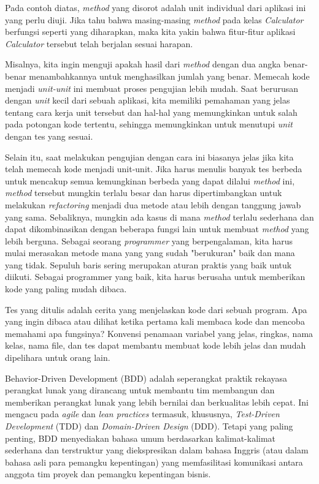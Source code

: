 \documentclass[a4paper,twoside]{article}
\begin{document}
\begin{enumerate}
Pada contoh diatas, \textit{method} yang disorot adalah unit individual dari aplikasi ini yang perlu diuji. Jika tahu bahwa masing-masing \textit{method} pada kelas \textit{Calculator} berfungsi seperti yang diharapkan, maka kita yakin bahwa fitur-fitur aplikasi \textit{Calculator} tersebut telah berjalan sesuai harapan.

Misalnya, kita ingin menguji apakah hasil dari \textit{method} dengan dua angka benar-benar menambahkannya untuk menghasilkan jumlah yang benar. Memecah kode menjadi \textit{unit-unit} ini membuat proses pengujian lebih mudah. Saat berurusan dengan \textit{unit} kecil dari sebuah aplikasi, kita memiliki pemahaman yang jelas tentang cara kerja unit tersebut dan hal-hal yang memungkinkan untuk salah pada potongan kode tertentu, sehingga memungkinkan untuk menutupi \textit{unit} dengan tes yang sesuai.

Selain itu, saat melakukan pengujian dengan cara ini biasanya jelas jika kita telah memecah kode menjadi unit-unit. Jika harus menulis banyak tes berbeda untuk mencakup semua kemungkinan berbeda yang dapat dilalui \textit{method} ini, \textit{method} tersebut mungkin terlalu besar dan harus dipertimbangkan untuk melakukan \textit{refactoring} menjadi dua metode atau lebih dengan tanggung jawab yang sama. Sebaliknya, mungkin ada kasus di mana \textit{method} terlalu sederhana dan dapat dikombinasikan dengan beberapa fungsi lain untuk membuat \textit{method} yang lebih berguna. Sebagai seorang \textit{programmer} yang berpengalaman, kita harus mulai merasakan metode mana yang yang sudah "berukuran" baik dan mana yang tidak. Sepuluh baris sering merupakan aturan praktis yang baik untuk diikuti. Sebagai programmer yang baik, kita harus berusaha untuk memberikan kode yang paling mudah dibaca.

Tes yang ditulis adalah cerita yang menjelaskan kode dari sebuah program. Apa yang ingin dibaca atau dilihat ketika pertama kali membaca kode dan mencoba memahami apa fungsinya? Konvensi penamaan variabel yang jelas, ringkas, nama kelas, nama file, dan tes dapat membantu membuat kode lebih jelas dan mudah dipelihara untuk orang lain.

Behavior-Driven Development (BDD) adalah seperangkat praktik rekayasa perangkat lunak yang dirancang untuk membantu tim membangun dan memberikan perangkat lunak yang lebih bernilai dan berkualitas lebih cepat. Ini mengacu pada \textit{agile} dan \textit{lean practices} termasuk, khususnya, \textit{Test-Driven Development} (TDD) dan \textit{Domain-Driven Design} (DDD). Tetapi yang paling penting, BDD menyediakan bahasa umum berdasarkan kalimat-kalimat sederhana dan terstruktur yang diekspresikan dalam bahasa Inggris (atau dalam bahasa asli para pemangku kepentingan) yang memfasilitasi komunikasi antara anggota tim proyek dan pemangku kepentingan bisnis.


\end{enumerate}
\end{document}
